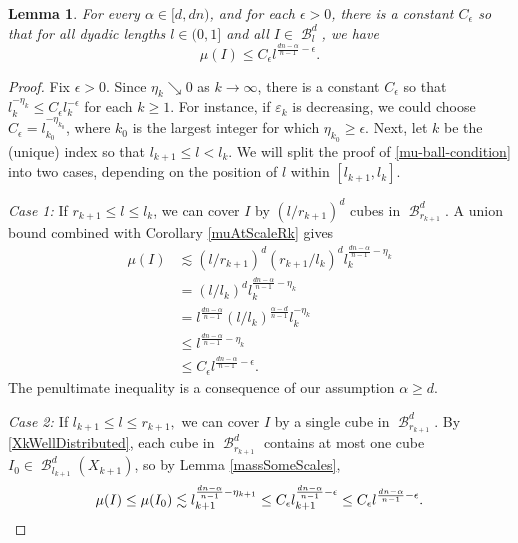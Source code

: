 \documentclass[dvipsnames,letterpaper,12pt]{article}
\numberwithin{equation}{section}
\theoremstyle{plain}
\newtheorem{lemma}{Lemma}
\theoremstyle{remark}
\DeclareMathOperator{\B}{\mathcal{B}}
\begin{document}
\begin{lemma} \label{frostmanBound}
	For every $\alpha \in [d, dn)$, and for each $\epsilon>0$, there is a constant $C_\epsilon$ so that for all dyadic lengths $l\in (0,1]$ and all $I \in \B_l^d$, we have
	\begin{equation} 
		\mu(I) \leq C_{\epsilon} l^{\frac{dn - \alpha}{n - 1} - \epsilon}. \label{mu-ball-condition} 
	\end{equation} 
\end{lemma}
\begin{proof}
	Fix $\epsilon > 0$. Since $\eta_k \searrow 0$ as $k\to\infty$, there is a constant $C_{\epsilon}$ so that $l_k^{-\eta_k}\leq C_{\epsilon}l_k^{-\epsilon}$ for each $k \geq 1$. For instance, if $\varepsilon_k$ is decreasing, we could choose $C_{\epsilon}=l_{k_0}^{-\eta_{k_0}}$, where $k_0$ is the largest integer for which $\eta_{k_0} \geq \epsilon$. Next, let $k$ be the (unique) index so that $l_{k+1}\leq l < l_{k}$. We will split the proof of \eqref{mu-ball-condition} into two cases, depending on the position of  $l$ within $[l_{k+1}, l_k]$. 

	\emph{Case 1:} If $r_{k+1} \leq l \leq l_k$, we can cover $I$ by $(l/r_{k+1})^d$ cubes in $\B^d_{r_{k+1}}$. A union bound combined with Corollary \ref{muAtScaleRk} gives
	\begin{equation}
	\begin{split}
	\mu(I) & \lesssim (l/r_{k+1})^d (r_{k+1}/l_k)^d l_k^{\frac{dn-\alpha}{n-1}-\eta_k} \\
	& = (l/l_k)^d l_k^{\frac{dn-\alpha}{n-1}-\eta_{k}}\\
	& = l^{\frac{dn-\alpha}{n-1}} (l/l_k)^{\frac{\alpha - d}{n-1}} l_k^{-\eta_k}\\
	& \leq l^{\frac{dn-\alpha}{n-1} - \eta_k}  \\
	& \leq C_{\epsilon}l^{\frac{dn-\alpha}{n-1}-\epsilon}.
	\end{split}
	\end{equation}
The penultimate inequality is a consequence of our assumption $\alpha \geq d$. 

	{\em{Case 2: }} If $l_{k+1} \leq l \leq r_{k+1},$ we can cover $I$ by a single cube in $\B^d_{r_{k+1}}$. By \eqref{XkWellDistributed}, each cube in $\B^d_{r_{k+1}}$ contains at most one cube $I_0 \in \B^d_{l_{k+1}}(X_{k+1})$, so by Lemma \ref{massSomeScales},
	\[ 
		\mu(I) \leq \mu(I_0) \lesssim l_{k+1}^{\frac{dn - \alpha}{n - 1} - \eta_{k+1}} 
		\leq C_{\epsilon}l_{k+1}^{\frac{dn - \alpha}{n - 1} - \epsilon}
		\leq C_{\epsilon}l^{\frac{dn - \alpha}{n - 1} - \epsilon}.\qedhere
	\]

\end{proof}
\end{document}
